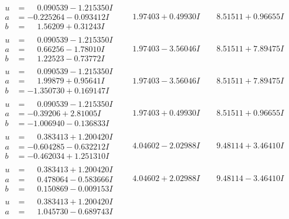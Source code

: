 \documentclass[1p]{elsarticle_modified}
\theoremstyle{definition}
\begin{document}
$$\begin{array}{c|c|c}
\begin{aligned}
u &= \phantom{-}0.090539 - 1.215350 I \\
a &= -0.225264 - 0.093412 I \\
b &= \phantom{-}1.56209 + 0.31243 I\end{aligned}
 & \phantom{-}1.97403 + 0.49930 I & \phantom{-}8.51511 + 0.96655 I \\ \hline\begin{aligned}
u &= \phantom{-}0.090539 - 1.215350 I \\
a &= \phantom{-}0.66256 - 1.78010 I \\
b &= \phantom{-}1.22523 - 0.73772 I\end{aligned}
 & \phantom{-}1.97403 - 3.56046 I & \phantom{-}8.51511 + 7.89475 I \\ \hline\begin{aligned}
u &= \phantom{-}0.090539 - 1.215350 I \\
a &= \phantom{-}1.99879 + 0.95641 I \\
b &= -1.350730 + 0.169147 I\end{aligned}
 & \phantom{-}1.97403 - 3.56046 I & \phantom{-}8.51511 + 7.89475 I \\ \hline\begin{aligned}
u &= \phantom{-}0.090539 - 1.215350 I \\
a &= -0.39206 + 2.81005 I \\
b &= -1.006940 - 0.136833 I\end{aligned}
 & \phantom{-}1.97403 + 0.49930 I & \phantom{-}8.51511 + 0.96655 I \\ \hline\begin{aligned}
u &= \phantom{-}0.383413 + 1.200420 I \\
a &= -0.604285 - 0.632212 I \\
b &= -0.462034 + 1.251310 I\end{aligned}
 & \phantom{-}4.04602 - 2.02988 I & \phantom{-}9.48114 + 3.46410 I \\ \hline\begin{aligned}
u &= \phantom{-}0.383413 + 1.200420 I \\
a &= \phantom{-}0.478064 - 0.583666 I \\
b &= \phantom{-}0.150869 - 0.009153 I\end{aligned}
 & \phantom{-}4.04602 + 2.02988 I & \phantom{-}9.48114 - 3.46410 I \\ \hline\begin{aligned}
u &= \phantom{-}0.383413 + 1.200420 I \\
a &= \phantom{-}1.045730 - 0.689743 I \\

\end{aligned}
\end{array}$$
\end{document}
